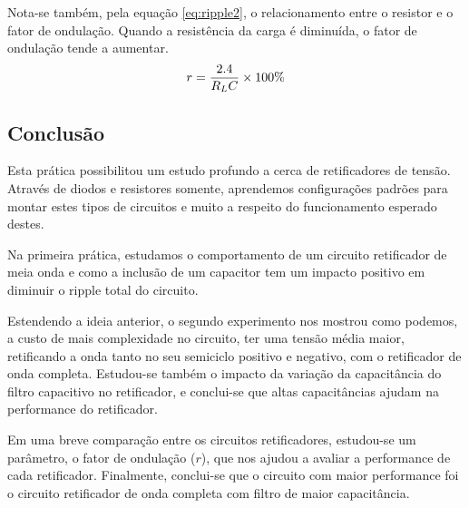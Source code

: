\documentclass[12pt,a4paper]{article}
\begin{document}
Nota-se também, pela equação \ref{eq:ripple2}, o relacionamento entre o resistor e o fator de ondulação. Quando a resistência da carga é diminuída, o fator de ondulação tende a aumentar. 
        \begin{align}
            \centering
            \label{eq:ripple2}
            r = \frac{2.4}{R_L C}\times 100\%
        \end{align}        
\newpage
\subsection{Conclusão} 
Esta prática possibilitou um estudo profundo a cerca de retificadores de tensão. Através de diodos e resistores somente, aprendemos configurações padrões para montar estes tipos de circuitos e muito a respeito do funcionamento esperado destes.

Na primeira prática, estudamos o comportamento de um circuito retificador de meia onda e como a inclusão de um capacitor tem um impacto positivo em diminuir o ripple total do circuito.

Estendendo a ideia anterior, o segundo experimento nos mostrou como podemos, a custo de mais complexidade no circuito, ter uma tensão média maior, retificando a onda tanto no seu semiciclo positivo e negativo, com o retificador de onda completa. Estudou-se também o impacto da variação da capacitância do filtro capacitivo no retificador, e conclui-se que altas capacitâncias ajudam na performance do retificador.

Em uma breve comparação entre os circuitos retificadores, estudou-se um parâmetro, o fator de ondulação ($r$), que nos ajudou a avaliar a performance de cada retificador. Finalmente,   conclui-se que o circuito com maior performance foi o circuito retificador de onda completa com filtro de maior capacitância.
\end{document}
